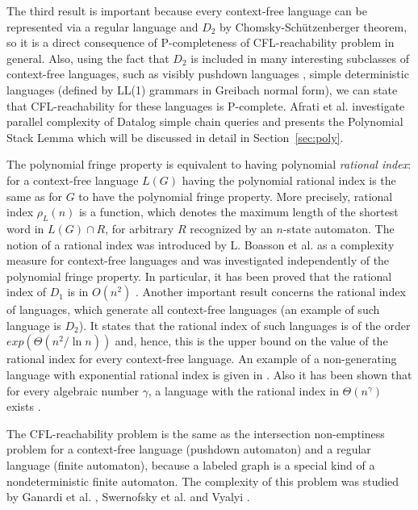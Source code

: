 \documentclass{ws-ijfcs}
\begin{document}
The third result is important because every context-free language can be represented via a regular language and $D_2$ by Chomsky-Sch{\"u}tzenberger theorem, so it is a direct consequence of P-completeness of CFL-reachability problem in general. Also, using the fact that $D_2$ is included in many interesting subclasses of context-free languages, such as visibly pushdown languages \cite{Okhotin2014ComplexityOI}, simple deterministic languages (defined by LL(1) grammars in Greibach normal form), we can state that CFL-reachability for these languages is P-complete. Afrati et al. \cite{ChainQ} investigate parallel complexity of Datalog simple chain queries and presents the Polynomial Stack Lemma which will be discussed in detail in Section~\ref{sec:poly}. 


The polynomial fringe property is equivalent to having polynomial \textit{rational index}: for a context-free language $L(G)$ having the polynomial rational index is the same as for $G$ to have the polynomial fringe property. More precisely, rational index $\rho_L(n)$ is a function, which denotes the maximum length of the shortest word in $L(G) \cap R$, for arbitrary $R$ recognized by an $n$-state automaton. The notion of a rational index was introduced by L. Boasson et al. \cite{RatBasic} as a complexity measure for context-free languages and was investigated independently of the polynomial fringe property.  In particular, it has been proved that the rational index of $D_1$ is in $O( n^2)$ \cite{Dyck1}. 
Another important result concerns the rational index of languages, which generate all context-free languages (an example of such language is $D_2$). It states that the rational index of such languages is of the order $exp(\Theta(n^2/\ln n))$ \cite{CFRat} and, hence, this is the upper bound on the value of the rational index for every context-free language. An example of a non-generating language with exponential rational index is given in \cite{Regularrealizability}. Also it has been shown that for every algebraic number $\gamma $, a language with the rational index in $\Theta (n^\gamma )$ exists \cite{GreibRat}. 


The CFL-reachability problem is the same as the intersection non-emptiness problem for a context-free language (pushdown automaton) and a regular language (finite automaton), because a labeled graph is a special kind of a nondeterministic finite automaton. The complexity of this problem was studied by Ganardi et al. \cite{ ganardi2016circuit} ,  Swernofsky et al. \cite{Intersection} and Vyalyi \cite{VyalyiRR}.
\end{document}
